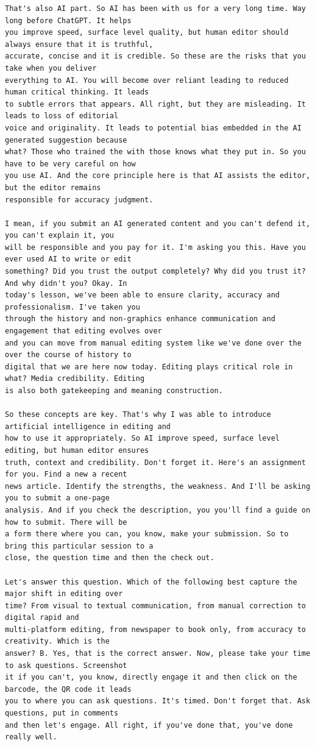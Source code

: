 {\begin{Verbatim}
That's also AI part. So AI has been with us for a very long time. Way long before ChatGPT. It helps
you improve speed, surface level quality, but human editor should always ensure that it is truthful,
accurate, concise and it is credible. So these are the risks that you take when you deliver
everything to AI. You will become over reliant leading to reduced human critical thinking. It leads
to subtle errors that appears. All right, but they are misleading. It leads to loss of editorial
voice and originality. It leads to potential bias embedded in the AI generated suggestion because
what? Those who trained the with those knows what they put in. So you have to be very careful on how
you use AI. And the core principle here is that AI assists the editor, but the editor remains
responsible for accuracy judgment.

I mean, if you submit an AI generated content and you can't defend it, you can't explain it, you
will be responsible and you pay for it. I'm asking you this. Have you ever used AI to write or edit
something? Did you trust the output completely? Why did you trust it? And why didn't you? Okay. In
today's lesson, we've been able to ensure clarity, accuracy and professionalism. I've taken you
through the history and non-graphics enhance communication and engagement that editing evolves over
and you can move from manual editing system like we've done over the over the course of history to
digital that we are here now today. Editing plays critical role in what? Media credibility. Editing
is also both gatekeeping and meaning construction.

So these concepts are key. That's why I was able to introduce artificial intelligence in editing and
how to use it appropriately. So AI improve speed, surface level editing, but human editor ensures
truth, context and credibility. Don't forget it. Here's an assignment for you. Find a new a recent
news article. Identify the strengths, the weakness. And I'll be asking you to submit a one-page
analysis. And if you check the description, you you'll find a guide on how to submit. There will be
a form there where you can, you know, make your submission. So to bring this particular session to a
close, the question time and then the check out.

Let's answer this question. Which of the following best capture the major shift in editing over
time? From visual to textual communication, from manual correction to digital rapid and
multi-platform editing, from newspaper to book only, from accuracy to creativity. Which is the
answer? B. Yes, that is the correct answer. Now, please take your time to ask questions. Screenshot
it if you can't, you know, directly engage it and then click on the barcode, the QR code it leads
you to where you can ask questions. It's timed. Don't forget that. Ask questions, put in comments
and then let's engage. All right, if you've done that, you've done really well.


\end{Verbatim}}
